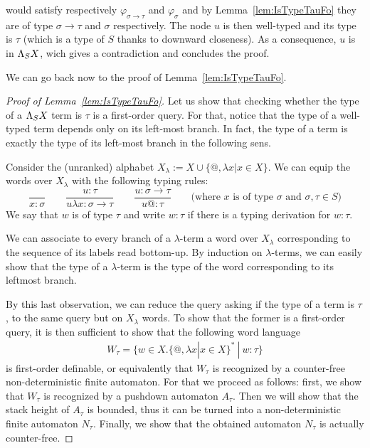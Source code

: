 would satisfy respectively $\varphi_{\sigma\rightarrow\tau}$ and  $\varphi_{\sigma}$ and by Lemma~\ref{lem:IsTypeTauFo} they are of type $\sigma\rightarrow\tau$ and $\sigma$ respectively. The node $u$ is then well-typed and its type is $\tau$ (which is a type of $S$ thanks to downward closeness). As a consequence, $u$ is in $\Lambda_{S} X$, wich gives a contradiction and concludes the proof.
 
We can go back now to the proof of Lemma~\ref{lem:IsTypeTauFo}.
\begin{proof}[Proof of Lemma~\ref{lem:IsTypeTauFo}]
Let us show that checking whether the type of a $\Lambda_{S} X$ term is $\tau$ is a first-order query. For that, notice that the type of a well-typed term depends only on its left-most branch. In fact, the type of a term is exactly the type of its left-most branch in the following sens.

Consider the (unranked) alphabet $ X_\lambda:= X\cup \{\text{@}, \lambda x | x\in X\}$. We can equip the words over $X_\lambda$ with the following typing rules:
$$\frac{}{x: \sigma} \qquad \frac{u:\tau}{u\lambda x: \sigma\rightarrow \tau} \qquad \frac{u:\sigma\rightarrow\tau}{u\text{@}:\tau}\qquad\text{(where $x$ is of type $\sigma$ and $\sigma,\tau \in S$)}$$
We say that $w$ is of type $\tau$ and write $w:\tau$ if there is a typing derivation for $w:\tau$.

We can associate to every branch of a $\lambda$-term a word over $X_\lambda$ corresponding to the sequence of its labels read bottom-up. By induction on $\lambda$-terms, we can easily show that the type of a $\lambda$-term is the type of the word corresponding to its leftmost branch. 

By this last observation, we can reduce the query asking if the type of a term is $\tau$, to the same query but on $X_\lambda$ words. To show that the former is a first-order query, it is then sufficient to show that the following word language 
\begin{align*}
W_\tau = \{w\in X.\{\text{@}, \lambda x | x\in X\}^*\ |\ w:\tau \} 
\end{align*}
is first-order definable, or equivalently that  $W_\tau$ is recognized by a counter-free non-deterministic finite automaton. For that we proceed as follows: first, we show that $W_\tau$ is recognized by a pushdown automaton $A_\tau$. Then we will show that the stack height of $A_\tau$ is bounded, thus it can be turned into a non-deterministic finite automaton $N_\tau$. Finally, we show that the obtained automaton $N_\tau$ is actually counter-free.  


\end{proof}

